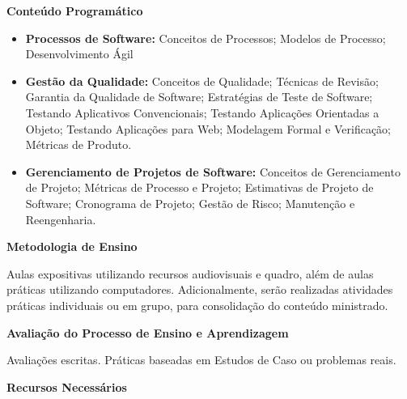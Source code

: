 
\begin{snugshade}\begin{center}\textbf{
    Conteúdo Programático
}\end{center}\end{snugshade}

\begin{itemize}

 \item \textbf{Processos de Software:} Conceitos de Processos; Modelos de Processo; Desenvolvimento Ágil
 
  \item \textbf{Gestão da Qualidade:} Conceitos de Qualidade; Técnicas de Revisão; Garantia da Qualidade de Software; Estratégias de Teste de Software; Testando Aplicativos Convencionais; Testando Aplicações Orientadas a Objeto; Testando Aplicações para Web; Modelagem Formal e Verificação; Métricas de Produto.
 \item \textbf{Gerenciamento de Projetos de Software:}  Conceitos de Gerenciamento de Projeto; Métricas de Processo e Projeto; Estimativas de Projeto de Software; Cronograma de Projeto; Gestão de Risco; Manutenção e Reengenharia.

\end{itemize}

\begin{snugshade}\begin{center}\textbf{
    Metodologia de Ensino
}\end{center}\end{snugshade} 

\noindent
   Aulas expositivas utilizando recursos audiovisuais e quadro, além de aulas práticas utilizando computadores. Adicionalmente, serão realizadas atividades práticas individuais ou em grupo, para consolidação do conteúdo ministrado.

\begin{snugshade}\begin{center}\textbf{
    Avaliação do Processo de Ensino e Aprendizagem
}\end{center}\end{snugshade}   

\noindent
  Avaliações escritas. Práticas baseadas em Estudos de Caso ou problemas reais.


\begin{snugshade}\begin{center}\textbf{
    Recursos Necessários
    \vphantom{q} %
}\end{center}\end{snugshade}

